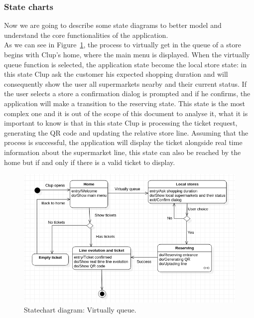 \subsubsection{State charts}
Now we are going to describe some state diagrams to better model and understand the core functionalities of the application.\\
As we can see in Figure~\ref{fig:VirtuallyQ}, the process to virtually get in the queue of a store begins with Clup's home, where the main menu is displayed. When the virtually queue function is selected, the application state become the local store state: in this state Clup ask the customer his expected shopping duration and will consequently show the user all supermarkets nearby and their current status. If the user selects a store a confirmation dialog is prompted and if he confirms, the application will make a transition to the reserving state. This state is the most complex one and it is out of the scope of this document to analyse it, what it is important to know is that in this state Clup is processing the ticket request, generating the QR code and updating the relative store line. Assuming that the process is successful, the application will display the ticket alongside real time information about the supermarket line, this state can also be reached by the home but if and only if there is a valid ticket to display.\\
\begin{figure} [H]
	\includegraphics[width=\linewidth]{../Diagrams/VirtuallyQueue.png}
	\caption{Statechart diagram: Virtually queue.}
	\label{fig:VirtuallyQ}
\end{figure}

